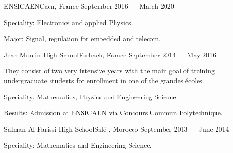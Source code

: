 
        {ENSICAEN}{Caen, France}
        {September 2016 --- March 2020}
        {
            \begin{additems}
                \item Speciality: Electronics and applied Physics.
                \item Major: Signal, regulation for embedded and telecom.
            \end{additems}
        }

        {Jean Moulin High School}{Forbach, France}
        {September 2014 --- May 2016}
        {
            \begin{additems}
                \item They consist of two very intensive years with the main goal of training undergraduate students for enrollment in one of the 
                {grandes \'ecoles}.
                \item Speciality: Mathematics, Physics and Engineering Science.
                \item Results: Admission at ENSICAEN via Concours Commun Polytechnique.
            \end{additems}
        }

        {Salman Al Farissi High School}{Sal\'e , Morocco}
        {September 2013 --- June 2014}
        {
            \begin{additems}
                \item Speciality: Mathematics and Engineering Science.
            \end{additems}
        }
